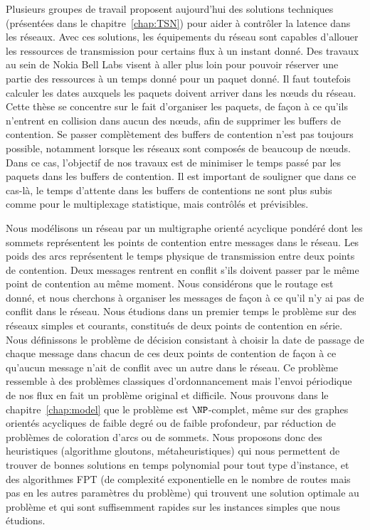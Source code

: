 Plusieurs groupes de travail proposent aujourd'hui des solutions techniques (présentées dans le chapitre~\ref{chap:TSN}) pour aider à contrôler la latence dans les réseaux. Avec ces solutions, les équipements du réseau sont capables d'allouer les ressources de transmission pour certains flux à un instant donné. Des travaux au sein de Nokia Bell Labs visent à aller plus loin pour pouvoir réserver une partie des ressources à un temps donné pour un paquet donné. Il faut toutefois calculer les dates auxquels les paquets doivent arriver dans les nœuds du réseau. Cette thèse se concentre sur le fait d'organiser les paquets, de façon à ce qu'ils n'entrent en collision dans aucun des nœuds, afin de supprimer les buffers de contention. Se passer complètement des buffers de contention n'est pas toujours possible, notamment lorsque les réseaux sont composés de beaucoup de nœuds. Dans ce cas, l'objectif de nos travaux est de minimiser le temps passé par les paquets dans les buffers de contention. Il est important de souligner que dans ce cas-là, le temps d'attente dans les buffers de contentions ne sont plus subis comme pour le multiplexage statistique, mais contrôlés et prévisibles.

Nous modélisons un réseau par un multigraphe orienté acyclique pondéré dont les sommets représentent les points de contention entre messages dans le réseau. Les poids des arcs représentent le temps physique de transmission entre deux points de contention. Deux messages rentrent en conflit s’ils doivent passer par le même point de contention au même moment. Nous considérons que le routage est donné, et nous cherchons à organiser les messages de façon à ce qu'il n'y ai pas de conflit dans le réseau. Nous étudions dans un premier temps le problème sur des réseaux simples et courants, constitués de deux points de contention en série. 
Nous définissons le problème de décision consistant à choisir la date de passage de chaque message dans chacun de ces deux points de contention de façon à ce qu'aucun message n'ait de conflit avec un autre dans le réseau. Ce problème ressemble à des problèmes classiques d'ordonnancement mais l'envoi périodique de nos flux en fait un problème original et difficile. Nous prouvons dans le chapitre~\ref{chap:model} que le problème est $\NP$-complet, même sur des graphes orientés acycliques de faible degré ou de faible profondeur, par réduction de problèmes de coloration d'arcs ou de sommets. Nous proposons donc des heuristiques (algorithme gloutons, métaheuristiques) qui nous permettent de trouver de bonnes solutions en temps polynomial pour tout type d'instance, et des algorithmes FPT (de complexité exponentielle en le nombre de routes mais pas en les autres paramètres du problème) qui trouvent une solution optimale au problème et qui sont suffisemment rapides sur les instances simples que nous étudions.


